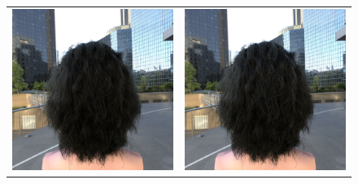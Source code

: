 \documentclass[11pt,a4paper]{report}
\begin{document}
\begin{figure}[h]
\begin{tabular}{cc}
\includegraphics[scale=0.16]{realworld/officesquare/deon_black1_32.png} &
\includegraphics[scale=0.16]{realworld/officesquare/uniform_black1_32.png} \\

\end{tabular}
\end{figure}
\end{document}
